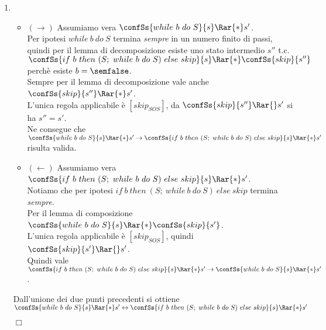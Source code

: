 {\begin{enumerate}[label=\alph*)]
    \item {} \\
    \begin{itemize}
      \item $(\rightarrow)$ Assumiamo vera $\confSs{while \ b \ do \ S}{s} \Rar{*} s'$. \\
         Per ipotesi $while \ b \ do \ S$ termina \textit{sempre} in un
         numero finito di passi, \\ quindi per il lemma di decomposizione esiste 
         uno stato intermedio $s''$ t.c. \\
         $\confSs{if  \ b \ then \ (S; \ while \ b \ do \ S) \ else \ skip}{s} 
         \Rar{*} \confSs{skip}{s''}$ perchè esiste $b = \semfalse$. \\
         Sempre per il lemma di decomposizione vale anche 
         $\confSs{skip}{s''} \Rar{*} s'$.\\
         L'unica regola applicabile è $[skip_{SOS}]$, da 
         $\confSs{skip}{s''} \Rar{} s'$ si ha $s''=s'$. \\
         Ne consegue che 
         $\confSs{while \ b \ do \ S}{s} \Rar{*} s' \rightarrow 
         \confSs{if  \ b \ then \ (S; \ while \ b \ do \ S) \ else \ skip}{s} 
         \Rar{*} s'$ risulta valida.
      \item $(\leftarrow)$ Assumiamo vera $\confSs{if  \ b \ then \ (S; \ while \ b \ do \              S) \ else \ skip}{s} \Rar{*} s'$. \\
            Notiamo che per ipotesi $if  \ b \ then \ (S; \ while \ b \ do \ S) \ else 
            \ skip$ termina \textit{sempre}. \\
            Per il lemma di composizione $\confSs{while \ b \ do \ S}{s} \Rar{*} 
            \confSs{skip}{s'}$. \\
            L'unica regola applicabile è $[skip_{SOS}]$, quindi 
            $\confSs{skip}{s'} \Rar{} s'$. \\
            Quindi vale 
            $\confSs{if  \ b \ then \ (S; \ while \ b \ do \ S) \ else \ skip}{s} 
            \Rar{*} s' \rightarrow \confSs{while \ b \ do \ S}{s} \Rar{*} s'$.
      \end{itemize}
         Dall'unione dei due punti precedenti si ottiene \\ 
         $\confSs{while \ b \ do \ S}{s} \Rar{*} s' \leftrightarrow 
         \confSs{if  \ b \ then \ (S; \ while \ b \ do \ S) \ else \ skip}{s} 
         \Rar{*} s'$
         \begin{flushright}
         $\Box$
         \end{flushright}


\end{enumerate}}
